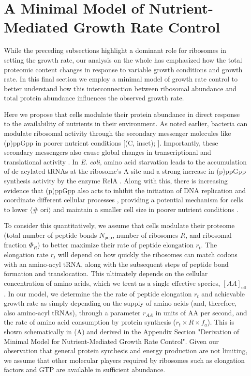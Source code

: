 \section{A Minimal Model of Nutrient-Mediated Growth Rate Control}
\label{sec:minimal_model}
While the preceding subsections highlight a dominant role for ribosomes in
setting the growth rate, our analysis on the whole has emphasized how the total
proteomic content changes in response to variable growth conditions and
growth rate. In this final section we employ a minimal model of growth rate control
to better understand how this interconnection between ribosomal abundance and
total protein abundance influences the observed growth rate.

Here we propose that cells modulate their protein abundance in direct response
to the availability of nutrients in their environment. As noted earlier,
bacteria can modulate ribosomal activity through the secondary messenger
molecules like (p)ppGpp in poorer nutrient conditions [(C,
inset); \cite{dai2016}]. Importantly, these secondary messengers also cause
global changes in transcriptional and translational activity
\citep{hauryliuk2015, zhu2019, Buke2020}. In \textit{E. coli}, amino acid
starvation leads to the accumulation of de-acylated tRNAs at the ribosome's
A-site and a strong increase in (p)ppGpp synthesis activity by the enzyme RelA
\citep{hauryliuk2015}. Along with this,  there is increasing evidence that
(p)ppGpp also acts to inhibit the initiation of DNA replication and coordinate different cellular processes
\citep{kraemer2019, vadia2017}, providing a potential mechanism for cells to lower $\langle$\#
ori$\rangle$ and maintain a smaller cell size in poorer nutrient conditions
\citep{fernandezcoll2020}.

To consider this quantitatively, we assume that cells modulate their proteome
(total number of peptide bonds $N_\text{pep}$, number of ribosomes $R$, and
ribosomal fraction $\Phi_R$) to better maximize their rate of peptide elongation
$r_t$. The elongation rate $r_t$ will depend on how quickly the ribosomes can
match codons with an amino-acyl tRNA, along with the subsequent steps of peptide
bond formation and translocation. This ultimately depends on the cellular
concentration of amino acids, which we treat as a single effective species,
$[AA]_\text{eff}$. In our model, we determine the the rate of peptide elongation
$r_t$ and achievable growth rate as simply depending on the supply of amino
acids (and, therefore, also amino-acyl tRNAs), through a parameter $r_{AA}$ in
units of AA per second, and the rate of amino acid consumption by protein
synthesis ($r_t \times R \times f_a$). This is shown schematically in
(A) and derived in the Appendix Section "Derivation
of Minimal Model for Nutrient-Mediated Growth Rate Control". Given our
observation that general protein synthesis and energy production are not limiting, we
assume that other molecular players required by ribosomes such as elongation
factors and GTP are available in sufficient abundance.


